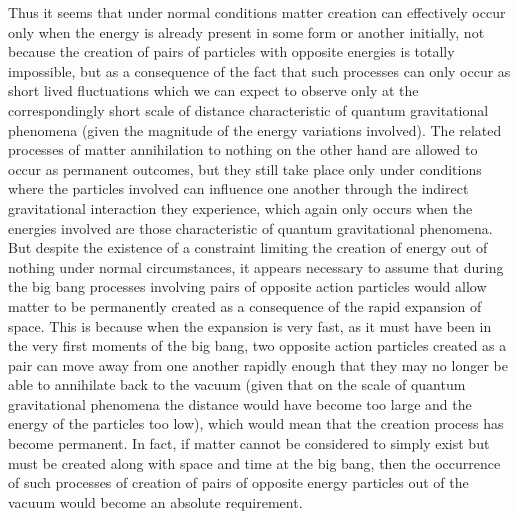 \documentclass[notitlepage,12pt]{report}
\begin{document}
Thus it seems that under normal conditions matter creation can effectively occur only when the energy is already present in some form or another initially, not because the creation of pairs of particles with opposite energies is totally impossible, but as a consequence of the fact that such processes can only occur as short lived fluctuations which we can expect to observe only at the correspondingly short scale of distance characteristic of quantum gravitational phenomena (given the magnitude of the energy variations involved). The related processes of matter annihilation to nothing on the other hand are allowed to occur as permanent outcomes, but they still take place only under conditions where the particles involved can influence one another through the indirect gravitational interaction they experience, which again only occurs when the energies involved are those characteristic of quantum gravitational phenomena. But despite the existence of a constraint limiting the creation of energy out of nothing under normal circumstances, it appears necessary to assume that during the big bang processes involving pairs of opposite action particles would allow matter to be permanently created as a consequence of the rapid expansion of space. This is because when the expansion is very fast, as it must have been in the very first moments of the big bang, two opposite action particles created as a pair can move away from one another rapidly enough that they may no longer be able to annihilate back to the vacuum (given that on the scale of quantum gravitational phenomena the distance would have become too large and the energy of the particles too low), which would mean that the creation process has become permanent. In fact, if matter cannot be considered to simply exist but must be created along with space and time at the big bang, then the occurrence of such processes of creation of pairs of opposite energy particles out of the vacuum would become an absolute requirement.
\end{document}
